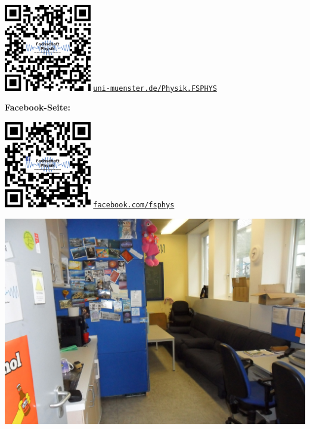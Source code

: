 \begin{multicols}{2}
\begin{minipage}{\columnwidth}
\begin{minipage}[t]{5cm}
		\includegraphics[width=3.8cm]{res/fsphys_qrcode_homepage.png}
		\scriptsize
		\href{https://www.uni-muenster.de/Physik.FSPHYS/}{\texttt{uni-muenster.de/Physik.FSPHYS}}
	\end{minipage}
	\hfill
	\begin{minipage}[t]{4cm}
		\raggedleft\parskip=0.1cm
		\textbf{Facebook-Seite:}
	
		\includegraphics[width=3.8cm]{res/fsphys_qrcode_facebook.png}
		\scriptsize
		\href{https://facebook.com/fsphys}{\texttt{facebook.com/fsphys}}
	\end{minipage}
\end{minipage}
\end{multicols}

\begin{center}
	\vspace{-2mm}
	\includegraphics[width=\columnwidth, height=0.42\textheight]{res/fsphys_foto_fs_raum_cropped.jpg}
\end{center}

